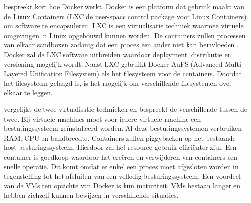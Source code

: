 \citet{chamberlain2014using} bespreekt kort hoe Docker werkt.
Docker is een platform dat gebruik maakt van de Linux Containers (LXC de user-space control package voor Linux Containers) om software te encapsuleren.
LXC is een virtualisatie techniek waarmee virtuele omgevingen in Linux opgebouwd kunnen worden.
De containers zullen processen van elkaar sandboxen zodanig dat een proces een ander niet kan beïnvloeden \citep{merkel2014docker}.
Docker zal de LXC software uitbreiden waardoor deployment, distributie en versioning mogelijk wordt.
Naast LXC gebruikt Docker AuFS (Advanced Multi-Layered Unification Filesystem) als het filesysteem voor de containers.
Doordat het filesysteem gelaagd is, is het mogelijk om verschillende filesystemen over elkaar te leggen.

\citet{merkel2014docker} vergelijkt de twee virtualisatie technieken en bespreekt de verschillende tussen de twee.
Bij virtuele machines moet voor iedere virtuele machine een besturingssysteem geïnstalleerd worden.
Al deze besturingssystemen verbruiken RAM, CPU en bandbreedte.
Containers zullen piggybacken op het bestaande host besturingssysteem.
Hierdoor zal het resource gebruik efficiënter zijn.
Een container is goedkoop waardoor het creëren en verwijderen van containers een snelle operatie.
Dit komt omdat er enkel een proces moet afgesloten worden in tegenstelling tot het afsluiten van een volledig besturingssysteem.
Een voordeel van de VMs ten opzichte van Docker is hun maturiteit.
VMs bestaan langer en hebben zichzelf kunnen bewijzen in verschillende situaties.

